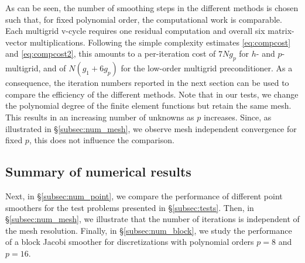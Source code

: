 \documentclass[times]{nlaauth}
\begin{document}
\begin{itemize}
\end{itemize}

As can be seen, the number of smoothing steps in the different methods
is chosen such that, for fixed polynomial order, the computational
work is comparable. Each multigrid v-cycle requires one residual
computation and overall six matrix-vector multiplications.  Following
the simple complexity estimates \eqref{eq:compcost} and
\eqref{eq:compcost2}, this amounts to a per-iteration cost of $7Ng_p$
for $h$- and $p$-multigrid, and of $N(g_1+6g_p)$ for the low-order
multigrid preconditioner. As a consequence, the iteration numbers
reported in the next section can be used to compare
the efficiency of the different methods.
%
Note that in our tests, we change the polynomial degree of the
finite element functions but retain the same mesh. This results in an
increasing number of unknowns as $p$ increases. Since, as illustrated
in \S\ref{subsec:num_mesh}, we observe mesh independent convergence
for fixed $p$, this does not influence the comparison.


\subsection{Summary of numerical results}\label{subsec:results}
Next, in \S\ref{subsec:num_point}, we compare the performance of
different point smoothers for the test problems presented in
\S\ref{subsec:tests}. Then, in \S\ref{subsec:num_mesh}, we
illustrate that the number of iterations is independent of the mesh
resolution. Finally, in \S\ref{subsec:num_block}, we study the
performance of a block Jacobi smoother for discretizations with
polynomial orders $p=8$ and $p=16$.
\end{document}
